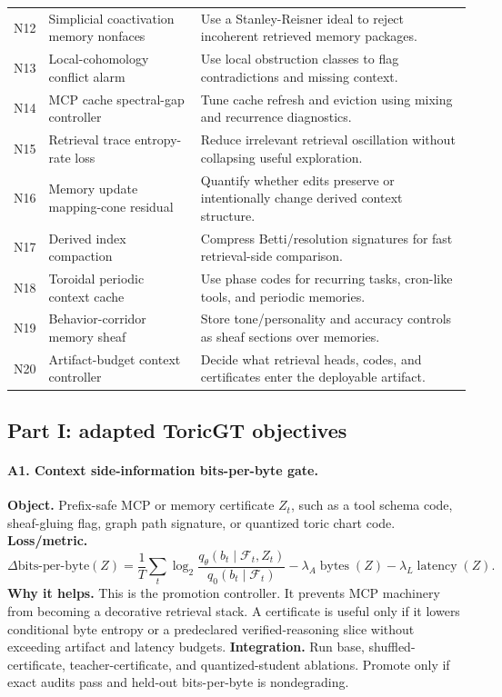 \documentclass[11pt]{article}
\newcommand{\bitsperbyte}{\mathrm{bits\mbox{-}per\mbox{-}byte}}
\numberwithin{equation}{section}
\begin{document}
\begin{longtable}{p{}p{}p{}}
N12 & Simplicial coactivation memory nonfaces & Use a Stanley-Reisner ideal to reject incoherent retrieved memory packages.\\
N13 & Local-cohomology conflict alarm & Use local obstruction classes to flag contradictions and missing context.\\
N14 & MCP cache spectral-gap controller & Tune cache refresh and eviction using mixing and recurrence diagnostics.\\
N15 & Retrieval trace entropy-rate loss & Reduce irrelevant retrieval oscillation without collapsing useful exploration.\\
N16 & Memory update mapping-cone residual & Quantify whether edits preserve or intentionally change derived context structure.\\
N17 & Derived index compaction & Compress Betti/resolution signatures for fast retrieval-side comparison.\\
N18 & Toroidal periodic context cache & Use phase codes for recurring tasks, cron-like tools, and periodic memories.\\
N19 & Behavior-corridor memory sheaf & Store tone/personality and accuracy controls as sheaf sections over memories.\\
N20 & Artifact-budget context controller & Decide what retrieval heads, codes, and certificates enter the deployable artifact.\\
\bottomrule
\end{longtable}
\normalsize

\clearpage
\subsection{Part I: adapted ToricGT objectives}

\paragraph{A1. Context side-information bits-per-byte gate.}
\textbf{Object.} Prefix-safe MCP or memory certificate $Z_t$, such as a tool schema code, sheaf-gluing flag, graph path signature, or quantized toric chart code. \textbf{Loss/metric.}
\begin{equation}
\Delta \bitsperbyte(Z)=\frac1T\sum_t\log_2\frac{q_\theta(b_t\mid\mathcal{F}_t,Z_t)}{q_0(b_t\mid\mathcal{F}_t)}-\lambda_A\operatorname{bytes}(Z)-\lambda_L\operatorname{latency}(Z).
\end{equation}
\textbf{Why it helps.} This is the promotion controller. It prevents MCP machinery from becoming a decorative retrieval stack. A certificate is useful only if it lowers conditional byte entropy or a predeclared verified-reasoning slice without exceeding artifact and latency budgets. \textbf{Integration.} Run base, shuffled-certificate, teacher-certificate, and quantized-student ablations. Promote only if exact audits pass and held-out bits-per-byte is nondegrading.
\end{document}
